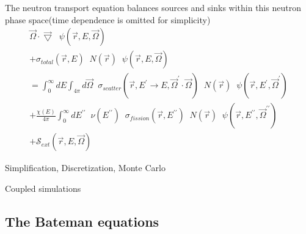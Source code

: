 \documentclass{beamer}
\begin{document}
        \begin{frame}{The neutron transport equation balances sources and sinks within this neutron phase space}{(time dependence is omitted for simplicity)}
            \begin{equation*}
                \begin{split}
                    \vec \Omega \cdot \vec \bigtriangledown \; \; \psi(\vec r, E, \vec \Omega) \\
                    + \sigma_{total}(\vec r, E) \; \; N(\vec r) \; \; \psi(\vec r, E, \vec\Omega) \\
                    = \int_0^\infty \! \! \! \! dE \int_{4\pi} \! \! \! \! d\vec\Omega \; \; \sigma_{scatter}(\vec r, E^\prime \rightarrow E, \vec \Omega^\prime \cdot \vec \Omega) \; \; N(\vec r) \; \; \psi(\vec r, E^\prime, \vec\Omega^\prime) \\
                    + \frac{\chi(E)}{4\pi} \int_0^\infty \! \! \! \! dE^{\prime\prime} \; \; \nu (E^{\prime\prime}) \; \; \sigma_{fission}(\vec r, E^{\prime\prime}) \; \; N(\vec r) \; \; \psi(\vec r, E^{\prime\prime}, \vec\Omega^{\prime\prime}) \\
                    + \mathcal{S}_{ext}(\vec r, E, \vec\Omega)
                \end{split}
            \end{equation*}
        \end{frame}

        \begin{frame}{Simplification, Discretization, Monte Carlo}
        \end{frame}

        \begin{frame}{Coupled simulations}
        \end{frame}

    \subsection{The Bateman equations}
\end{document}
